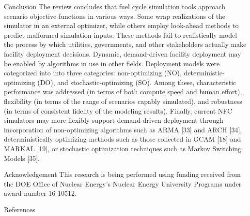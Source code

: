 \documentclass[final]{beamer}
\newlength{\onecolwid}
\begin{document}
\begin{frame}[t]
\begin{columns}[t]
\begin{column}{\onecolwid}
\begin{block}{Conclusion}
The review concludes that fuel cycle simulation tools approach scenario objective 
functions in various ways. Some wrap realizations of the simulator in an external
optimizer, while others employ look-ahead methods to predict malformed simulation inputs. 
These methods fail to realistically model the process by which utilities, governments,
and other stakeholders actually make facility deployment decisions.
Dynamic, demand-driven facility deployment may be enabled by algorithms in use in
other fields. Deployment models were categorized into into three categories:
non-optimizing (NO), deterministic-optimizing (DO), and stochastic-optimizing (SO).
Among these, characteristic performance was addressed (in terms of both compute
speed and human effort), flexibility (in terms of the range of scenarios capably
simulated), and robustness (in terms of consistent fidelity of the modeling results).
Finally, current NFC simulators may more flexibly support demand-driven deployment
through incorporation of non-optimizing algorithms such as ARMA [33] and ARCH [34],
deterministically optimizing methods such as those collected in GCAM [18] and
MARKAL [19], or stochastic optimization techniques such as Markov Switching Models [35].
\end{block}


\begin{block}{Acknowledgement}
This research is being performed using funding received
from the DOE Office of Nuclear Energy's Nuclear Energy
University Programs under award number 16-10512.
\end{block}


\begin{block}{References}

\end{block}



\end{column}
\end{columns}
\end{frame}
\end{document}
